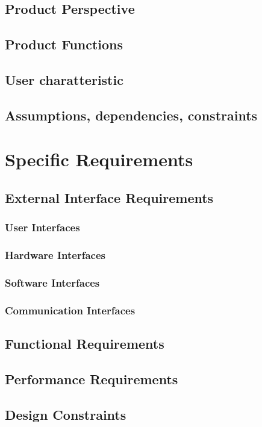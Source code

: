 \documentclass{Configuration_Files/PoliMi3i_thesis}
\begin{document}
\section{Product Perspective}
\section{Product Functions}
\section{User charatteristic}
\section{Assumptions, dependencies, constraints}


\chapter{Specific Requirements}

\section{External Interface Requirements}
\subsection{User Interfaces}
\subsection{Hardware Interfaces}
\subsection{Software Interfaces}
\subsection{Communication Interfaces}

\section{Functional Requirements}
\section{Performance Requirements}

\section{Design Constraints}
\end{document}
